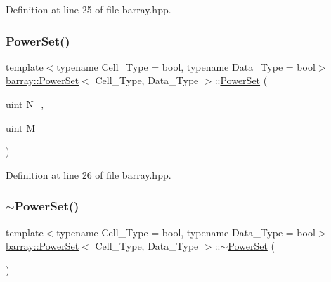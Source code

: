 Definition at line 25 of file barray.\+hpp.

\mbox{\label{classbarray_1_1_power_set_a27260fc29e88af115702af0b060a1015}} 
\subsubsection{\texorpdfstring{Power\+Set()}{PowerSet()}\hspace{0.1cm}{\footnotesize\ttfamily [2/2]}}
{\footnotesize\ttfamily template$<$typename Cell\+\_\+\+Type  = bool, typename Data\+\_\+\+Type  = bool$>$ \\
\hyperlink{classbarray_1_1_power_set}{barray\+::\+Power\+Set}$<$ Cell\+\_\+\+Type, Data\+\_\+\+Type $>$\+::\hyperlink{classbarray_1_1_power_set}{Power\+Set} (\begin{DoxyParamCaption}\item[{\hyperlink{namespacebarray_af9756a31953db233f80a9cfe1ef31c32}{uint}}]{N\+\_\+,  }\item[{\hyperlink{namespacebarray_af9756a31953db233f80a9cfe1ef31c32}{uint}}]{M\+\_\+ }\end{DoxyParamCaption})\hspace{0.3cm}{\ttfamily [inline]}}



Definition at line 26 of file barray.\+hpp.

\mbox{\label{classbarray_1_1_power_set_ac1c4670f4f8920f0a9b1123045a75830}} 
\subsubsection{\texorpdfstring{$\sim$\+Power\+Set()}{~PowerSet()}}
{\footnotesize\ttfamily template$<$typename Cell\+\_\+\+Type  = bool, typename Data\+\_\+\+Type  = bool$>$ \\
\hyperlink{classbarray_1_1_power_set}{barray\+::\+Power\+Set}$<$ Cell\+\_\+\+Type, Data\+\_\+\+Type $>$\+::$\sim$\hyperlink{classbarray_1_1_power_set}{Power\+Set} (\begin{DoxyParamCaption}{ }\end{DoxyParamCaption})\hspace{0.3cm}{\ttfamily [inline]}}



